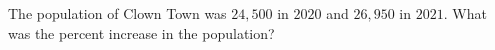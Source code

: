 The population of Clown Town was $24{,}500$ in $2020$ and $26{,}950$ in $2021$. What was the percent increase in the population?
